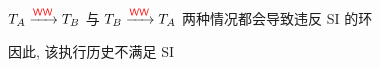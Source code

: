 \begin{frame}{}
  \begin{center}
		$T_{A} \xrightarrow{\textcolor{red}{\textup{\textsf{WW}}}} T_{B}$
		与 $T_{B} \xrightarrow{\textcolor{red}{\textup{\textsf{WW}}}} T_{A}$ 两种情况都会导致违反 SI 的环

		\vspace{0.20cm}
		\vspace{0.20cm}

		因此, 该执行历史不满足 SI
  \end{center}
\end{frame}







